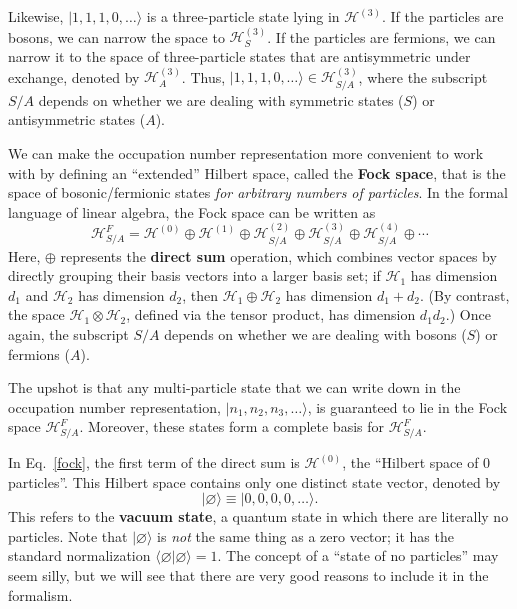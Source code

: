 \documentclass[prx,12pt]{revtex4-2}
\begin{document}
Likewise, $|1,1,1,0,\dots\rangle$ is a three-particle state lying in
$\mathscr{H}^{(3)}$.  If the particles are bosons, we can narrow the
space to $\mathscr{H}^{(3)}_S$.  If the particles are fermions, we can
narrow it to the space of three-particle states that are antisymmetric
under exchange, denoted by $\mathscr{H}^{(3)}_A$.  Thus,
$|1,1,1,0,\dots\rangle \in \mathscr{H}^{(3)}_{S/A}$, where the
subscript $S/A$ depends on whether we are dealing with symmetric
states ($S$) or antisymmetric states ($A$).

We can make the occupation number representation more convenient to
work with by defining an ``extended'' Hilbert space, called the
\textbf{Fock space}, that is the space of bosonic/fermionic states
\textit{for arbitrary numbers of particles}.  In the formal language
of linear algebra, the Fock space can be written as
\begin{equation}
  \mathscr{H}_{S/A}^F = \mathscr{H}^{(0)} \oplus \mathscr{H}^{(1)} \oplus \mathscr{H}^{(2)}_{S/A} \oplus \mathscr{H}^{(3)}_{S/A} \oplus \mathscr{H}^{(4)}_{S/A} \oplus \cdots
  \label{fock}
\end{equation}
Here, $\oplus$ represents the \textbf{direct sum} operation, which
combines vector spaces by directly grouping their basis vectors into a
larger basis set; if $\mathscr{H}_1$ has dimension $d_1$ and
$\mathscr{H}_2$ has dimension $d_2$, then
$\mathscr{H}_1\oplus\mathscr{H}_2$ has dimension $d_1+d_2$.  (By
contrast, the space $\mathscr{H}_1\otimes\mathscr{H}_2$, defined via
the tensor product, has dimension $d_1d_2$.)  Once again, the
subscript $S/A$ depends on whether we are dealing with bosons ($S$) or
fermions ($A$).

The upshot is that any multi-particle state that we can write down in
the occupation number representation, $|n_1,n_2,n_3,\dots\rangle$, is
guaranteed to lie in the Fock space $\mathscr{H}^{F}_{S/A}$.
Moreover, these states form a complete basis for
$\mathscr{H}^{F}_{S/A}$.

In Eq.~\eqref{fock}, the first term of the direct sum is
$\mathscr{H}^{(0)}$, the ``Hilbert space of 0 particles''.  This
Hilbert space contains only one distinct state vector, denoted by
\begin{equation}
  |\varnothing\rangle \equiv |0,0,0,0,\dots\rangle.
\end{equation}
This refers to the \textbf{vacuum state}, a quantum state in which
there are literally no particles.  Note that $|\varnothing\rangle$ is
\textit{not} the same thing as a zero vector; it has the standard
normalization $\langle\varnothing|\varnothing\rangle = 1$.  The
concept of a ``state of no particles'' may seem silly, but we will see
that there are very good reasons to include it in the formalism.
\end{document}
